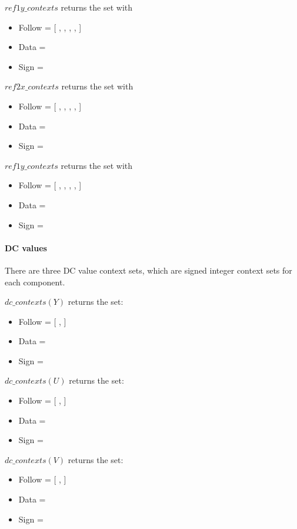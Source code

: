 $ref1y\_contexts$ returns the set with
\begin{itemize}
\item Follow = [ \RefOneyFollowOne, \RefOneyFollowTwo, \RefOneyFollowThree, \RefOneyFollowFour, \RefOneyFollowFivePlus ]
\item Data = \RefOneyData
\item Sign = \RefOneySign
\end{itemize}

$ref2x\_contexts$ returns the set with
\begin{itemize}
\item Follow = [ \RefTwoxFollowOne, \RefTwoxFollowTwo, \RefTwoxFollowThree, \RefTwoxFollowFour, \RefTwoxFollowFivePlus ]
\item Data = \RefTwoxData
\item Sign = \RefTwoxSign
\end{itemize}

$ref1y\_contexts$ returns the set with
\begin{itemize}
\item Follow = [ \RefTwoyFollowOne, \RefTwoyFollowTwo, \RefTwoyFollowThree, \RefTwoyFollowFour, \RefTwoyFollowFivePlus ]
\item Data = \RefTwoyData
\item Sign = \RefTwoySign
\end{itemize}

\paragraph{DC values \\}
\label{dcvaluecontexts}

There are three DC value context sets, which are signed integer context sets for each component. 

$dc\_contexts(Y)$ returns the set:

\begin{itemize}
\item Follow = [ \YDCFollowOne, \YDCFollowTwoPlus ]
\item Data = \YDCData
\item Sign = \YDCSign
\end{itemize}

$dc\_contexts(U)$ returns the set:

\begin{itemize}
\item Follow = [ \UDCFollowOne, \UDCFollowTwoPlus ]
\item Data = \UDCData
\item Sign = \UDCSign
\end{itemize}

$dc\_contexts(V)$ returns the set:

\begin{itemize}
\item Follow = [ \VDCFollowOne, \VDCFollowTwoPlus ]
\item Data = \VDCData
\item Sign = \VDCSign
\end{itemize}